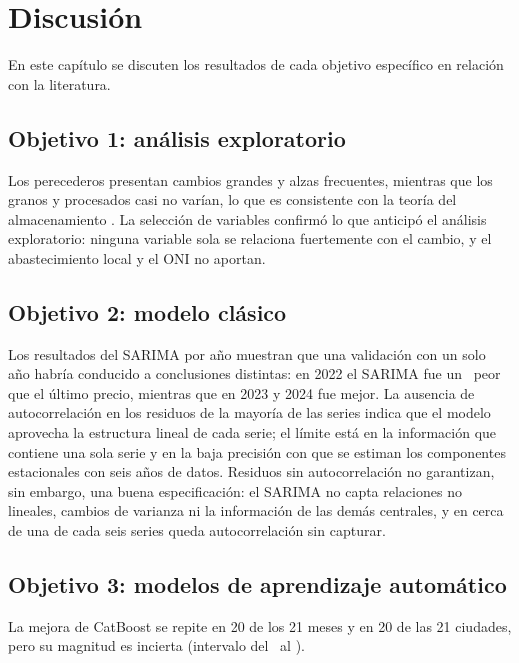 \chapter{Discusión}
\label{cap:discusion}

En este capítulo se discuten los resultados de cada objetivo específico en relación con la literatura.


\section{Objetivo 1: análisis exploratorio}

Los perecederos presentan cambios grandes y alzas frecuentes, mientras que los granos y procesados casi no varían, lo que es consistente con la teoría del almacenamiento \citep{working1949,deaton1992}. La selección de variables confirmó lo que anticipó el análisis exploratorio: ninguna variable sola se relaciona fuertemente con el cambio, y el abastecimiento local y el ONI no aportan.

\section{Objetivo 2: modelo clásico}

Los resultados del SARIMA por año muestran que una validación con un solo año habría conducido a conclusiones distintas: en 2022 el SARIMA fue un \rvsaraabs\pct\ peor que el último precio, mientras que en 2023 y 2024 fue mejor. La ausencia de autocorrelación en los residuos de la mayoría de las series indica que el modelo aprovecha la estructura lineal de cada serie; el límite está en la información que contiene una sola serie y en la baja precisión con que se estiman los componentes estacionales con seis años de datos. Residuos sin autocorrelación no garantizan, sin embargo, una buena especificación: el SARIMA no capta relaciones no lineales, cambios de varianza ni la información de las demás centrales, y en cerca de una de cada seis series queda autocorrelación sin capturar.

\section{Objetivo 3: modelos de aprendizaje automático}

La mejora de CatBoost se repite en 20 de los 21 meses y en 20 de las 21 ciudades, pero su magnitud es incierta (intervalo del \cmejloe\pct\ al \cmejhie\pct).


